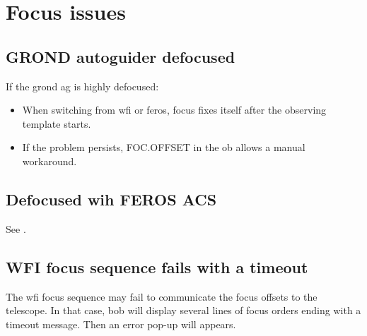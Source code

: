 \documentclass[11pt,fleqn,a4paper]{book}
\begin{document}
\section{Focus issues}

\subsection{GROND autoguider defocused}

If the \gls{grond} \gls{ag} is highly defocused:
\begin{itemize}
  \item When switching from \gls{wfi} or \gls{feros}, \gls{focus} fixes itself after the observing \gls{template} starts.
  \item If the problem persists, FOC.OFFSET in the \gls{ob} allows a manual workaround.
\end{itemize}

\subsection{Defocused wih FEROS ACS}

See .

\subsection{WFI focus sequence fails with a timeout}
\label{sec:wfifocseqtimeout}
The \gls{wfi} \gls{focus} sequence may fail to communicate the focus offsets to the telescope.  In that case, \gls{bob} will display several lines of focus orders ending with a timeout message. Then an error pop-up will appears.
\end{document}
